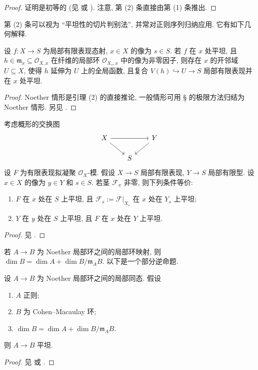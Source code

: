 \begin{proof}
证明是初等的 (见 \cite[定理 $22.5$]{Mat89} 或 \cite[Tag 00ME]{SP}). 注意, 第 (2) 条直接由第 (1) 条推出.
\end{proof}
第 (2) 条可以视为 ``平坦性的切片判别法'', 并常对正则序列归纳应用. 它有如下几何解释.
\begin{corollary}[平坦性的切片判别法]\label{src:A.2.9}
设 $f:X\to S$ 为局部有限表现态射, $x\in X$ 的像为 $s\in S$. 若 $f$ 在 $x$ 处平坦, 且 $h\in\mathfrak m_x\subseteq\mathcal O_{X,x}$ 在纤维的局部环 $\mathcal O_{X_s,x}$ 中的像为非零因子, 则存在 $x$ 的开邻域 $U\subseteq X$, 使得 $h$ 延伸为 $U$ 上的全局函数, 且复合 $V(h)\hookrightarrow U\to S$ 局部有限表现并在 $x$ 处平坦.
\end{corollary}
\begin{proof}
Noether 情形是引理 (2) 的直接推论, 一般情形可用 \S{} 的极限方法归结为 Noether 情形. 另见 \cite[Tag 056X]{SP}.
\end{proof}
\begin{theorem}[纤维平坦性判别法]\label{src:A.2.10}
考虑概形的交换图
\[
\begin{tikzcd}[column sep=2em,row sep=1.5em]
X\arrow[rr]\arrow[dr]&&Y\arrow[dl]\\&S&
\end{tikzcd}
\]
设 $F$ 为有限表现拟凝聚 $\mathcal O_X$-模. 假设 $X\to S$ 局部有限表现, $Y\to S$ 局部有限型. 设 $x\in X$ 的像为 $y\in Y$ 和 $s\in S$. 若茎 $\mathcal F_x$ 非零, 则下列条件等价:
\begin{enumerate}[(1)]
\item $F$ 在 $x$ 处在 $S$ 上平坦, 且 $\mathcal F_s:=\mathcal F|_{X_s}$ 在 $x$ 处在 $Y_s$ 上平坦;
\item $Y$ 在 $y$ 处在 $S$ 上平坦, 且 $F$ 在 $x$ 处在 $Y$ 上平坦.
\end{enumerate}
\end{theorem}
\begin{proof}
见 \cite[Tag 039A]{SP}.
\end{proof}
若 $A\to B$ 为 Noether 局部环之间的局部环映射, 则 $\dim B=\dim A+\dim B/\mathfrak m_A B$. 以下是一个部分逆命题.
\begin{theorem}[奇迹平坦性]\label{src:A.2.11}
设 $A\to B$ 为 Noether 局部环之间的局部同态. 假设
\begin{enumerate}[1.]
\item $A$ 正则;
\item $B$ 为 Cohen--Macaulay 环;
\item $\dim B=\dim A+\dim B/\mathfrak m_A B$.
\end{enumerate}
则 $A\to B$ 平坦.
\end{theorem}
\begin{proof}
见 \cite[定理 $25.16$]{Nag62} 或 \cite[Tag 00R4]{SP}.
\end{proof}

